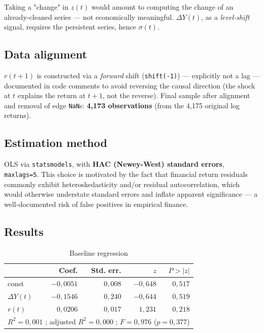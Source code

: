 \documentclass[12pt,a4paper]{article}
\begin{document}
\vspace{0.8cm} 

Taking
a "change" in $z(t)$ would amount to computing the change of an already-cleaned series --- not economically meaningful.
$\Delta Y(t)$, as a \emph{level-shift} signal,
requires the persistent series, hence $\sigma(t)$.

\newpage

\subsection{Data alignment}

$r(t+1)$ is constructed via a \emph{forward}
shift (\texttt{shift(-1)}) --- explicitly not a lag ---
documented in code comments to avoid reversing the
causal direction (the shock at $t$ explains the return at $t+1$, not the reverse).
Final sample after alignment and removal of edge
\texttt{NaN}s: \textbf{4,173 observations} (from the 4,175 original
log returns).

\subsection{Estimation method}

OLS via \texttt{statsmodels}, with \textbf{HAC
	(Newey-West) standard errors}, \texttt{maxlags=5}. This choice is motivated by the fact that
financial return residuals commonly exhibit
heteroskedasticity and/or residual autocorrelation, which would
otherwise understate standard errors and inflate apparent
significance --- a well-documented risk of false positives
in empirical finance.

\subsection{Results}

\begin{table}[H]
	\centering
	\caption{Baseline regression}
	\begin{tabular}{lrrrr}
		\toprule
		& Coef. & Std. err. & $z$ & $P>|z|$ \\
		\midrule
		const & $-0{,}0051$ & $0{,}008$ & $-0{,}648$ & $0{,}517$ \\
		$\Delta Y(t)$ & $-0{,}1546$ & $0{,}240$ & $-0{,}644$ & $0{,}519$ \\
		$r(t)$ & $0{,}0206$ & $0{,}017$ & $1{,}231$ & $0{,}218$ \\
		\midrule
		\multicolumn{5}{l}{$R^2 = 0{,}001$ ; adjusted $R^2 = 0{,}000$ ; $F = 0{,}976$ ($p=0{,}377$)} \\
		\bottomrule
	\end{tabular}
\end{table}
\end{document}

